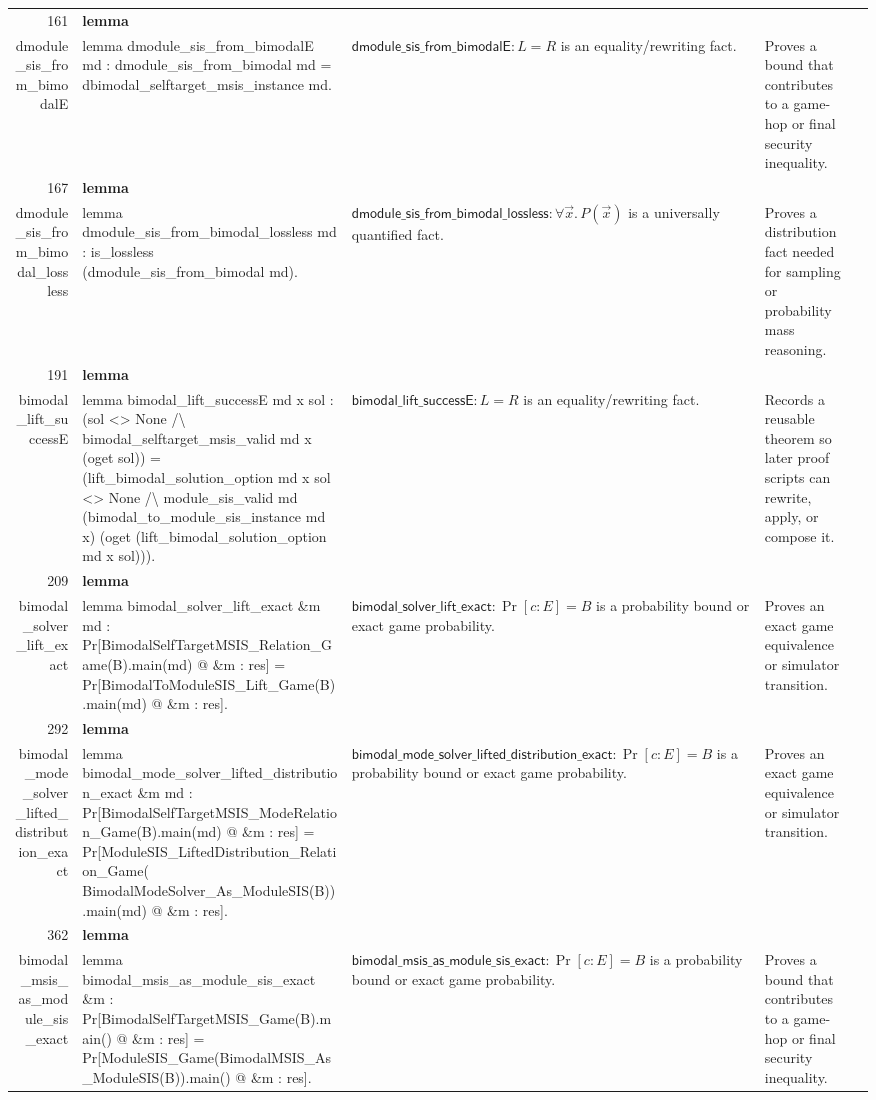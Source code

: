 \documentclass[10pt]{article}
\newcommand{\ec}[1]{\begingroup\ttfamily\scriptsize #1\endgroup}
\begin{document}
\begin{longtable}{r L{0.17\textwidth} L{0.26\textwidth} L{0.27\textwidth} L{0.20\textwidth}}
161 & \textbf{lemma}\\\ec{dmodule\_sis\_from\_bimodalE} & \ec{lemma dmodule\_sis\_from\_bimodalE md : dmodule\_sis\_from\_bimodal md = dbimodal\_selftarget\_msis\_instance md.} & \(\mathsf{dmodule\_sis\_from\_bimodalE} : L = R\) is an equality/rewriting fact. & Proves a bound that contributes to a game-hop or final security inequality. \\
167 & \textbf{lemma}\\\ec{dmodule\_sis\_from\_bimodal\_lossless} & \ec{lemma dmodule\_sis\_from\_bimodal\_lossless md : is\_lossless (dmodule\_sis\_from\_bimodal md).} & \(\mathsf{dmodule\_sis\_from\_bimodal\_lossless} : \forall \vec{x}.\, P(\vec{x})\) is a universally quantified fact. & Proves a distribution fact needed for sampling or probability mass reasoning. \\
191 & \textbf{lemma}\\\ec{bimodal\_lift\_successE} & \ec{lemma bimodal\_lift\_successE md x sol : (sol <> None /\textbackslash{} bimodal\_selftarget\_msis\_valid md x (oget sol)) = (lift\_bimodal\_solution\_option md x sol <> None /\textbackslash{} module\_sis\_valid md (bimodal\_to\_module\_sis\_instance md x) (oget (lift\_bimodal\_solution\_option md x sol))).} & \(\mathsf{bimodal\_lift\_successE} : L = R\) is an equality/rewriting fact. & Records a reusable theorem so later proof scripts can rewrite, apply, or compose it. \\
209 & \textbf{lemma}\\\ec{bimodal\_solver\_lift\_exact} & \ec{lemma bimodal\_solver\_lift\_exact \&m md : Pr[BimodalSelfTargetMSIS\_Relation\_Game(B).main(md) @ \&m : res] = Pr[BimodalToModuleSIS\_Lift\_Game(B).main(md) @ \&m : res].} & \(\mathsf{bimodal\_solver\_lift\_exact} : \Pr[c : E] = B\) is a probability bound or exact game probability. & Proves an exact game equivalence or simulator transition. \\
292 & \textbf{lemma}\\\ec{bimodal\_mode\_solver\_lifted\_distribution\_exact} & \ec{lemma bimodal\_mode\_solver\_lifted\_distribution\_exact \&m md : Pr[BimodalSelfTargetMSIS\_ModeRelation\_Game(B).main(md) @ \&m : res] = Pr[ModuleSIS\_LiftedDistribution\_Relation\_Game( BimodalModeSolver\_As\_ModuleSIS(B)).main(md) @ \&m : res].} & \(\mathsf{bimodal\_mode\_solver\_lifted\_distribution\_exact} : \Pr[c : E] = B\) is a probability bound or exact game probability. & Proves an exact game equivalence or simulator transition. \\
362 & \textbf{lemma}\\\ec{bimodal\_msis\_as\_module\_sis\_exact} & \ec{lemma bimodal\_msis\_as\_module\_sis\_exact \&m : Pr[BimodalSelfTargetMSIS\_Game(B).main() @ \&m : res] = Pr[ModuleSIS\_Game(BimodalMSIS\_As\_ModuleSIS(B)).main() @ \&m : res].} & \(\mathsf{bimodal\_msis\_as\_module\_sis\_exact} : \Pr[c : E] = B\) is a probability bound or exact game probability. & Proves a bound that contributes to a game-hop or final security inequality. \\
\bottomrule
\end{longtable}
\end{document}
